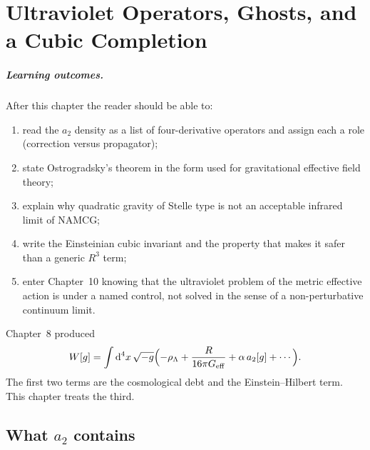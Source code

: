 \chapter[Ultraviolet completion]{Ultraviolet Operators, Ghosts, and a Cubic Completion}
\label{ch:ultraviolet}

\paragraph{Learning outcomes.}
After this chapter the reader should be able to:
\begin{enumerate}
  \item read the \(a_2\) density as a list of four-derivative
        operators and assign each a role (correction versus
        propagator);
  \item state Ostrogradsky's theorem in the form used for
        gravitational effective field theory;
  \item explain why quadratic gravity of Stelle type is not an
        acceptable infrared limit of NAMCG;
  \item write the Einsteinian cubic invariant and the property that
        makes it safer than a generic \(R^3\) term;
  \item enter Chapter~10 knowing that the ultraviolet problem of
        the metric effective action is under a named control,
        not solved in the sense of a non-perturbative continuum
        limit.
\end{enumerate}

Chapter~8 produced
\begin{equation}
  \label{eq:W-again-9}
  W[g]
  =\int\mathrm{d}^4x\,\sqrt{-g}
   \Bigl(
     -\rho_\Lambda
     +\frac{R}{16\pi G_{\mathrm{eff}}}
     +\alpha\,a_2[g]
     +\cdots
   \Bigr).
\end{equation}
The first two terms are the cosmological debt and the Einstein--Hilbert
term. This chapter treats the third.

\section{What \(a_2\) contains}
\label{sec:ch9-a2}

